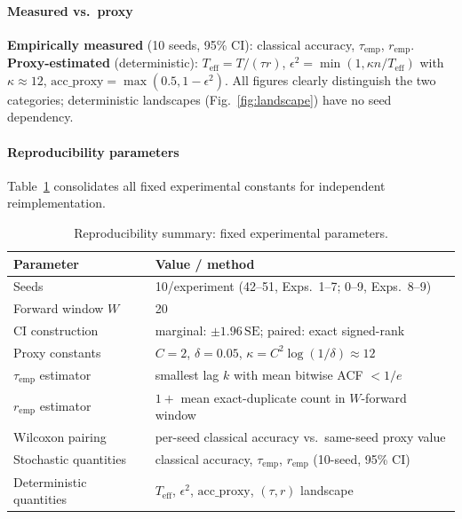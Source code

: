 \documentclass[sensors,article,submit,pdftex,moreauthors]{Definitions/mdpi}
\newcommand{\Teff}{T_{\mathrm{eff}}}
\begin{document}
\paragraph{Measured vs.\ proxy} \textbf{Empirically measured} (10 seeds, 95\% CI): classical accuracy, $\tau_{\text{emp}}$, $r_{\text{emp}}$. \textbf{Proxy-estimated} (deterministic): $\Teff = T/(\tau r)$, $\epsilon^2 = \min(1, \kappa n/\Teff)$ with $\kappa \approx 12$, $\mathrm{acc\_proxy} = \max(0.5, 1-\epsilon^2)$. All figures clearly distinguish the two categories; deterministic landscapes (Fig.~\ref{fig:landscape}) have no seed dependency.

\paragraph{Reproducibility parameters} Table~\ref{tab:repro} consolidates all fixed experimental constants for independent reimplementation.

\begin{table}[t]
\centering
\caption{Reproducibility summary: fixed experimental parameters.}
\label{tab:repro}
\small
\begin{tabular}{@{}ll@{}}
\toprule
Parameter & Value / method \\
\midrule
Seeds & 10/experiment (42--51, Exps.\ 1--7; 0--9, Exps.\ 8--9) \\
Forward window $W$ & 20 \\
CI construction & marginal: $\pm 1.96\,\mathrm{SE}$; paired: exact signed-rank \\
Proxy constants & $C = 2$, $\delta = 0.05$, $\kappa = C^2 \log(1/\delta) \approx 12$ \\
$\tau_{\text{emp}}$ estimator & smallest lag $k$ with mean bitwise ACF $< 1/e$ \\
$r_{\text{emp}}$ estimator & $1 +$ mean exact-duplicate count in $W$-forward window \\
Wilcoxon pairing & per-seed classical accuracy vs.\ same-seed proxy value \\
Stochastic quantities & classical accuracy, $\tau_{\text{emp}}$, $r_{\text{emp}}$ (10-seed, 95\% CI) \\
Deterministic quantities & $\Teff$, $\epsilon^2$, $\mathrm{acc\_proxy}$, $(\tau,r)$ landscape \\
\bottomrule
\end{tabular}
\end{table}


\end{document}
